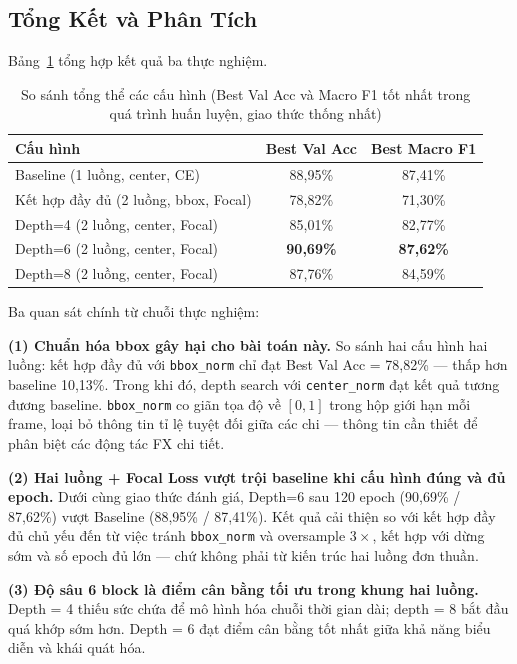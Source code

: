 \documentclass[conference]{IEEEtran}
\begin{document}
\subsection{Tổng Kết và Phân Tích}
\label{sec:summary}

Bảng~\ref{tab:full_comparison} tổng hợp kết quả ba thực nghiệm.

\begin{table}[!t]
\caption{So sánh tổng thể các cấu hình (Best Val Acc và Macro F1 tốt
         nhất trong quá trình huấn luyện, giao thức thống nhất)}
\label{tab:full_comparison}
\centering
\begin{tabular}{lcc}
\toprule
Cấu hình & Best Val Acc & Best Macro F1 \\
\midrule
Baseline (1 luồng, center, CE)          & 88,95\% & 87,41\% \\
Kết hợp đầy đủ (2 luồng, bbox, Focal)  & 78,82\% & 71,30\% \\
\midrule
Depth=4 (2 luồng, center, Focal)        & 85,01\% & 82,77\% \\
Depth=6 (2 luồng, center, Focal)        & \textbf{90,69\%} & \textbf{87,62\%} \\
Depth=8 (2 luồng, center, Focal)        & 87,76\% & 84,59\% \\
\bottomrule
\end{tabular}
\end{table}

Ba quan sát chính từ chuỗi thực nghiệm:

\textbf{(1) Chuẩn hóa bbox gây hại cho bài toán này.} So sánh hai
cấu hình hai luồng: kết hợp đầy đủ với \texttt{bbox\_norm} chỉ đạt
Best Val Acc = 78,82\% --- thấp hơn baseline 10,13\%. Trong khi đó,
depth search với \texttt{center\_norm} đạt kết quả tương đương
baseline. \texttt{bbox\_norm} co giãn tọa độ về $[0,1]$ trong hộp
giới hạn mỗi frame, loại bỏ thông tin tỉ lệ tuyệt đối giữa các chi
--- thông tin cần thiết để phân biệt các động tác FX chi tiết.

\textbf{(2) Hai luồng + Focal Loss vượt trội baseline khi cấu hình
đúng và đủ epoch.} Dưới cùng giao thức đánh giá, Depth=6 sau 120 epoch
(90,69\% / 87,62\%) vượt Baseline (88,95\% / 87,41\%). Kết quả cải
thiện so với kết hợp đầy đủ chủ yếu đến từ việc tránh \texttt{bbox\_norm}
và oversample $3\times$, kết hợp với dừng sớm và số epoch đủ lớn ---
chứ không phải từ kiến trúc hai luồng đơn thuần.

\textbf{(3) Độ sâu 6 block là điểm cân bằng tối ưu trong khung hai
luồng.} Depth = 4 thiếu sức chứa để mô hình hóa chuỗi thời gian dài;
depth = 8 bắt đầu quá khớp sớm hơn. Depth = 6 đạt điểm cân bằng
tốt nhất giữa khả năng biểu diễn và khái quát hóa.
\end{document}
